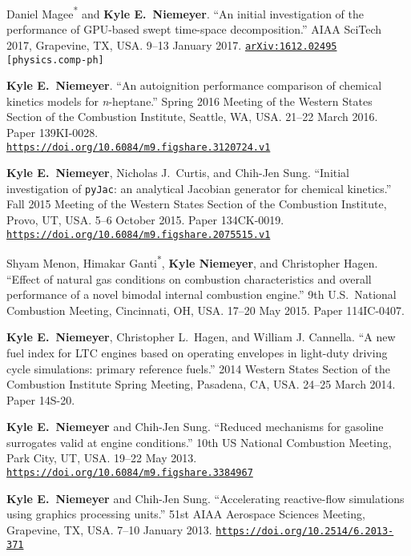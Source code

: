 \documentclass[margin,line,11pt]{res}
\makeatletter
\newlength{\bibhang}
\newlength{\bibsep}
 {\@listi \global\bibsep\itemsep \global\advance\bibsep by\parsep}
\newenvironment{bibenum*}
  {\renewcommand\labelenumi{\theenumi.}%
   \etaremune[
     topsep=0pt,
     itemsep=\bibsep,
     parsep=0pt,partopsep=0pt,
     itemindent=-\bibhang,
     leftmargin={\bibhang+\widthof{[999]}}]}
  {\endetaremune}
\newcommand*{\doi}[1]{\href{https://doi.org/#1}{\nolinkurl{https://doi.org/#1}}}
\makeatother
\begin{document}
\begin{resume}
\begin{bibenum*}
\item Daniel Magee\textsuperscript{*} and \textbf{Kyle E.~Niemeyer}.
``An initial investigation of the performance of GPU-based swept time-space decomposition.''
AIAA SciTech 2017, Grapevine, TX, USA.
9--13 January 2017.
{\tt \href{http://arxiv.org/abs/1612.02495}{arXiv:1612.02495} [physics.comp-ph]}

\item \textbf{Kyle E.~Niemeyer}. ``An autoignition performance comparison of chemical kinetics models for \emph{n}-heptane.''
Spring 2016 Meeting of the Western States Section of the Combustion Institute, Seattle, WA, USA.
21--22 March 2016.
Paper 139KI-0028. \\
\doi{10.6084/m9.figshare.3120724.v1}

\item \textbf{Kyle E.~Niemeyer}, Nicholas J.\ Curtis, and Chih-Jen Sung. ``Initial investigation of \texttt{pyJac}: an analytical Jacobian generator for chemical kinetics.''
Fall 2015 Meeting of the Western States Section of the Combustion Institute, Provo, UT, USA.
5--6 October 2015.
Paper 134CK-0019.
\doi{10.6084/m9.figshare.2075515.v1}

\item Shyam Menon, Himakar Ganti\textsuperscript{*}, \textbf{Kyle Niemeyer}, and Christopher Hagen.
``Effect of natural gas conditions on combustion characteristics and overall performance of a novel bimodal internal combustion engine.''
9th U.S.~National Combustion Meeting, Cincinnati, OH, USA.
17--20 May 2015.
Paper 114IC-0407.

\item \textbf{Kyle E.~Niemeyer}, Christopher L.\ Hagen, and William J. Cannella.
``A new fuel index for LTC engines based on operating envelopes in light-duty driving cycle simulations: primary reference fuels.''
2014 Western States Section of the Combustion Institute Spring Meeting, Pasadena, CA, USA.
24--25 March 2014.
Paper 14S-20.

\item \textbf{Kyle E.~Niemeyer} and Chih-Jen Sung.
``Reduced mechanisms for gasoline surrogates valid at engine conditions.''
10th US National Combustion Meeting, Park City, UT, USA.
19--22 May 2013.
\doi{10.6084/m9.figshare.3384967}

\item \textbf{Kyle E.~Niemeyer} and Chih-Jen Sung.
``Accelerating reactive-flow simulations using graphics processing units.''
51st AIAA Aerospace Sciences Meeting, Grapevine, TX, USA.
7--10 January 2013.
\doi{10.2514/6.2013-371}


\end{bibenum*}
\end{resume}
\end{document}
